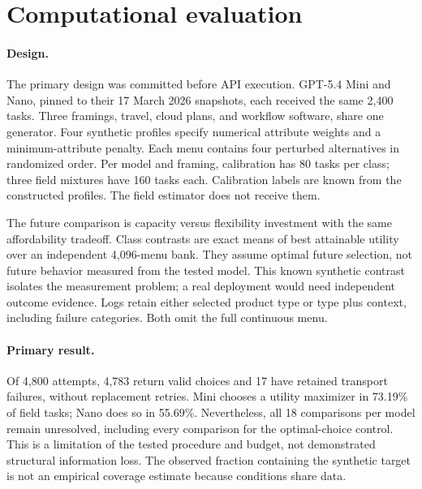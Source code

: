 \documentclass[manuscript,review,anonymous]{acmart}
\begin{document}
\section{Computational evaluation}
\paragraph{Design.}
The primary design was committed before API execution. GPT-5.4 Mini and Nano, pinned to their 17 March 2026 snapshots, each received the same 2,400 tasks. Three framings, travel, cloud plans, and workflow software, share one generator. Four synthetic profiles specify numerical attribute weights and a minimum-attribute penalty. Each menu contains four perturbed alternatives in randomized order. Per model and framing, calibration has 80 tasks per class; three field mixtures have 160 tasks each. Calibration labels are known from the constructed profiles. The field estimator does not receive them.

The future comparison is capacity versus flexibility investment with the same affordability tradeoff. Class contrasts are exact means of best attainable utility over an independent 4,096-menu bank. They assume optimal future selection, not future behavior measured from the tested model. This known synthetic contrast isolates the measurement problem; a real deployment would need independent outcome evidence. Logs retain either selected product type or type plus context, including failure categories. Both omit the full continuous menu.

\paragraph{Primary result.}
Of 4,800 attempts, 4,783 return valid choices and 17 have retained transport failures, without replacement retries. Mini chooses a utility maximizer in 73.19\% of field tasks; Nano does so in 55.69\%. Nevertheless, all 18 comparisons per model remain unresolved, including every comparison for the optimal-choice control. This is a limitation of the tested procedure and budget, not demonstrated structural information loss. The observed fraction containing the synthetic target is not an empirical coverage estimate because conditions share data.
\end{document}

